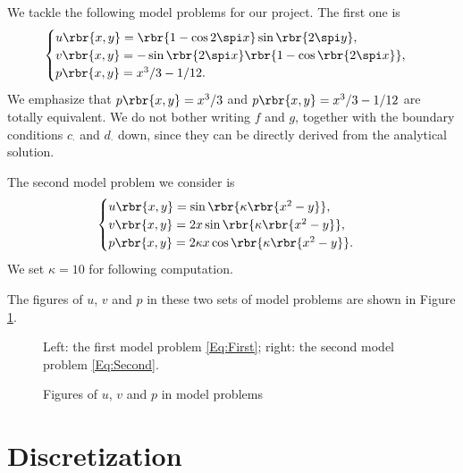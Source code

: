 \documentclass[english, nochinese]{pnote}
\begin{document}
We tackle the following model problems for our project. The first one is
\begin{equation} \label{Eq:First}
\begin{cases}
u \rbr{ x, y } = \rbr{ 1 - \cos 2 \spi x } \sin \rbr{ 2 \spi y }, \\
v \rbr{ x, y } = -\sin \rbr{ 2 \spi x } \rbr{ 1 - \cos \rbr{ 2 \spi x } }, \\
p \rbr{ x, y } = x^3 / 3 - 1 / 12.
\end{cases}
\end{equation}
We emphasize that $ p \rbr{ x, y } = x^3 / 3 $ and $ p \rbr{ x, y } = x^3 / 3 - 1 / 12 $ are totally equivalent. We do not bother writing $f$ and $g$, together with the boundary conditions $c_{\cdot}$ and $d_{\cdot}$ down, since they can be directly derived from the analytical solution.

The second model problem we consider is
\begin{equation} \label{Eq:Second}
\begin{cases}
u \rbr{ x, y } = \sin \rbr{ \kappa \rbr{ x^ 2- y } }, \\
v \rbr{ x, y } = 2 x \sin \rbr{ \kappa \rbr{ x^2 - y } }, \\
p \rbr{ x, y } = 2 \kappa x \cos \rbr{ \kappa \rbr{ x^2 - y } }.
\end{cases}
\end{equation}
We set $ \kappa = 10 $ for following computation.

The figures of $u$, $v$ and $p$ in these two sets of model problems are shown in Figure \ref{Fig:HeatMap}.

\begin{figure}[htbp]
{
\centering
\scalebox{0.75}{}
\caption{Figures of $u$, $v$ and $p$ in model problems}
\label{Fig:HeatMap}
}
{
\footnotesize Left: the first model problem \eqref{Eq:First}; right: the second model problem \eqref{Eq:Second}.
}
\end{figure}

\section{Discretization}
\end{document}
